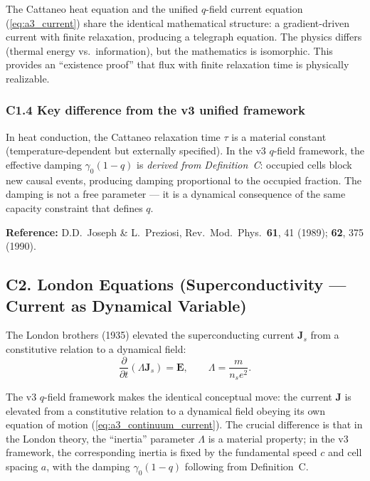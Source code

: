 \documentclass[reprint]{revtex4-2}
\begin{document}
The Cattaneo heat equation and the unified $q$-field current equation (\ref{eq:a3_current}) share the identical mathematical structure: a gradient-driven current with finite relaxation, producing a telegraph equation. The physics differs (thermal energy vs.\ information), but the mathematics is isomorphic. This provides an ``existence proof'' that flux with finite relaxation time is physically realizable.

\subsubsection{C1.4 Key difference from the v3 unified framework}

In heat conduction, the Cattaneo relaxation time $\tau$ is a material constant (temperature-dependent but externally specified). In the v3 $q$-field framework, the effective damping $\gamma_0(1-q)$ is \emph{derived from Definition~C}: occupied cells block new causal events, producing damping proportional to the occupied fraction. The damping is not a free parameter --- it is a dynamical consequence of the same capacity constraint that defines $q$.

\textbf{Reference:} D.D.\ Joseph \& L.\ Preziosi, Rev.\ Mod.\ Phys.\ \textbf{61}, 41 (1989); \textbf{62}, 375 (1990).

\subsection{C2. London Equations (Superconductivity --- Current as Dynamical Variable)}

The London brothers (1935) elevated the superconducting current $\mathbf{J}_s$ from a constitutive relation to a dynamical field:
\begin{equation}
\frac{\partial}{\partial t}(\Lambda\mathbf{J}_s) = \mathbf{E}, \qquad \Lambda = \frac{m}{n_s e^2}.
\end{equation}

The v3 $q$-field framework makes the identical conceptual move: the current $\mathbf{J}$ is elevated from a constitutive relation to a dynamical field obeying its own equation of motion (\ref{eq:a3_continuum_current}). The crucial difference is that in the London theory, the ``inertia'' parameter $\Lambda$ is a material property; in the v3 framework, the corresponding inertia is fixed by the fundamental speed $c$ and cell spacing $a$, with the damping $\gamma_0(1-q)$ following from Definition~C.
\end{document}
